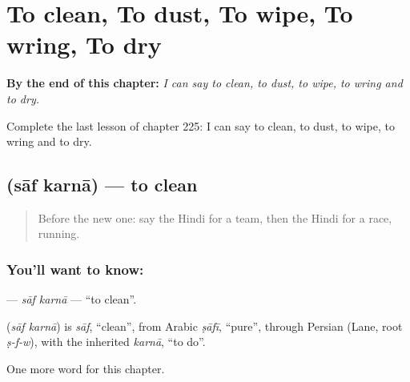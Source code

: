 
\chapter{To clean, To dust, To wipe, To wring, To dry}
\label{ch:hi-to-clean-to-dust-to-wipe-to-wring-to-dry}

\begin{chapteropening}
\textbf{By the end of this chapter:} \emph{I can say to clean, to dust, to wipe, to wring and to dry.}

Complete the last lesson of chapter 225: I can say to clean, to dust, to wipe, to wring and to dry.
\end{chapteropening}

\section[\texorpdfstring{\hi{साफ़} \hi{करना} (sāf karnā)}{साफ़ करना (sāf karnā)}]{  (sāf karnā) — to clean}

\label{lesson:HI-C225-safkarna}



\begin{quote}
Before the new one: say the Hindi for a team, then the Hindi for a race, running.
\end{quote}

\subsection*{You'll want to know:  }
\textbf{ } — \emph{sāf karnā} — \textquotedblleft{}to clean\textquotedblright{}.

\begin{cousinweb}
\textbf{ } (\emph{sāf karnā}) is \emph{sāf}, \textquotedblleft{}clean\textquotedblright{}, from Arabic \emph{ṣāfī}, \textquotedblleft{}pure\textquotedblright{}, through Persian (Lane, root \emph{ṣ-f-w}), with the inherited \emph{karnā}, \textquotedblleft{}to do\textquotedblright{}.
\end{cousinweb}

\begin{grammarlens}[title={What you've built}]
One more word for this chapter.
\end{grammarlens}

